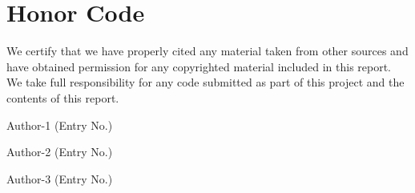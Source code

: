 \chapter*{Honor Code}
We certify that we have properly cited any material taken from other sources and have obtained permission for any copyrighted material included in this report. We take full responsibility for any code submitted as part of this  project and the contents of this report.\\
\vspace*{15mm}

\begin{flushright}
Author-1 (Entry No.)\\
\end{flushright}

\vspace*{15mm}

\begin{flushright}
Author-2 (Entry No.)\\
\end{flushright}

\vspace*{15mm}

\begin{flushright}
Author-3 (Entry No.)\\
\end{flushright}

